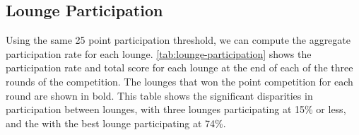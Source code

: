 \subsection{Lounge Participation}

Using the same 25 point participation threshold, we can compute the aggregate participation rate for each lounge. \autoref{tab:lounge-participation} shows the participation rate and total score for each lounge at the end of each of the three rounds of the competition. The lounges that won the point competition for each round are shown in bold. This table shows the significant disparities in participation between lounges, with three lounges participating at 15\% or less, and the with the best lounge participating at 74\%.

